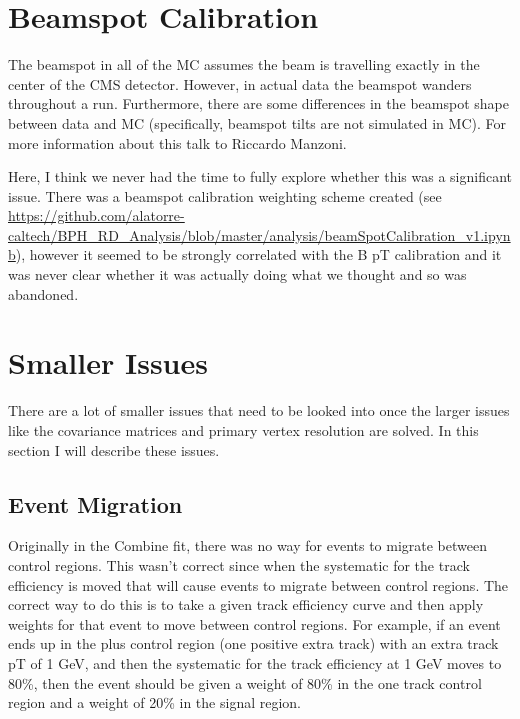 \documentclass[12pt]{report}
\begin{document}
\section{Beamspot Calibration}
The beamspot in all of the MC assumes the beam is travelling exactly in the
center of the CMS detector. However, in actual data the beamspot wanders
throughout a run. Furthermore, there are some differences in the beamspot shape
between data and MC (specifically, beamspot tilts are not simulated in MC). For
more information about this talk to Riccardo Manzoni.

Here, I think we never had the time to fully explore whether this was a
significant issue. There was a beamspot calibration weighting scheme created
(see
\url{https://github.com/alatorre-caltech/BPH_RD_Analysis/blob/master/analysis/beamSpotCalibration_v1.ipynb}),
however it seemed to be strongly correlated with the B pT calibration and it
was never clear whether it was actually doing what we thought and so was
abandoned.

\section{Smaller Issues}
There are a lot of smaller issues that need to be looked into once the larger issues like the covariance matrices and primary vertex resolution are solved. In this section I will describe these issues.
\subsection{Event Migration}
Originally in the Combine fit, there was no way for events to migrate between
control regions. This wasn't correct since when the systematic for the track
efficiency is moved that will cause events to migrate between control regions.
The correct way to do this is to take a given track efficiency curve and then
apply weights for that event to move between control regions. For example, if
an event ends up in the plus control region (one positive extra track) with an
extra track pT of 1 GeV, and then the systematic for the track efficiency at 1
GeV moves to 80\%, then the event should be given a weight of 80\% in the one
track control region and a weight of 20\% in the signal region.
\end{document}
